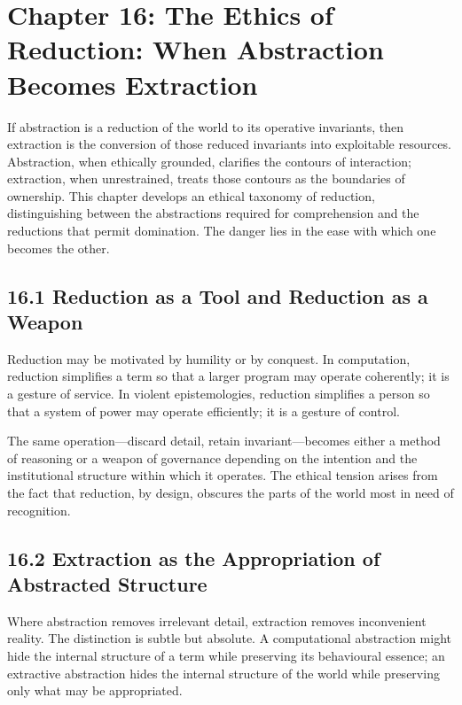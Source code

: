 \documentclass[12pt,letterpaper]{article}
\theoremstyle{remark}
\begin{document}
\section{Chapter 16: The Ethics of Reduction: When Abstraction Becomes Extraction}

If abstraction is a reduction of the world to its operative invariants, then extraction is the conversion of those reduced invariants into exploitable resources. Abstraction, when ethically grounded, clarifies the contours of interaction; extraction, when unrestrained, treats those contours as the boundaries of ownership. This chapter develops an ethical taxonomy of reduction, distinguishing between the abstractions required for comprehension and the reductions that permit domination. The danger lies in the ease with which one becomes the other.

\subsection{16.1 Reduction as a Tool and Reduction as a Weapon}

Reduction may be motivated by humility or by conquest. In computation, reduction simplifies a term so that a larger program may operate coherently; it is a gesture of service. In violent epistemologies, reduction simplifies a person so that a system of power may operate efficiently; it is a gesture of control.

The same operation—discard detail, retain invariant—becomes either a method of reasoning or a weapon of governance depending on the intention and the institutional structure within which it operates. The ethical tension arises from the fact that reduction, by design, obscures the parts of the world most in need of recognition.

\subsection{16.2 Extraction as the Appropriation of Abstracted Structure}

Where abstraction removes irrelevant detail, extraction removes inconvenient reality. The distinction is subtle but absolute. A computational abstraction might hide the internal structure of a term while preserving its behavioural essence; an extractive abstraction hides the internal structure of the world while preserving only what may be appropriated.
\end{document}
